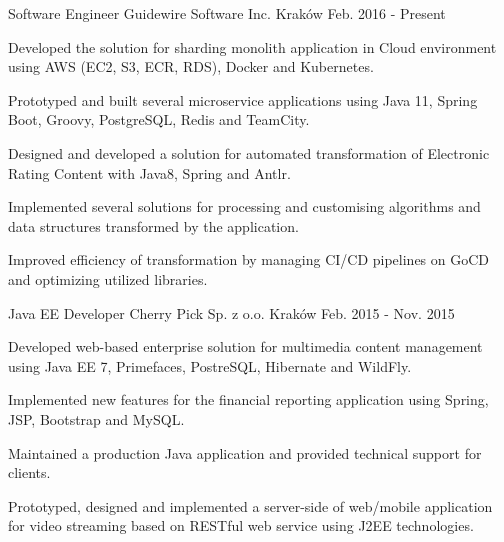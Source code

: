 

\begin{cventries}

  \cventry
    {Software Engineer} %
    {Guidewire Software Inc.} %
    {Kraków} %
    {Feb. 2016 - Present} %
    {
      \begin{cvitems} %
        \item {Developed the solution for sharding monolith application in Cloud environment using AWS (EC2, S3, ECR, RDS), Docker and Kubernetes.}
        \item {Prototyped and built several microservice applications using Java 11, Spring Boot, Groovy, PostgreSQL, Redis and TeamCity.}
        \item {Designed and developed a solution for automated transformation of Electronic Rating Content with Java8, Spring and Antlr.}
        \item {Implemented several solutions for processing and customising algorithms and data structures transformed by the application.}
        \item {Improved efficiency of transformation by managing CI/CD pipelines on GoCD and optimizing utilized libraries.}
      \end{cvitems}
    }

  \cventry
    {Java EE Developer} %
    {Cherry Pick Sp. z o.o.} %
    {Kraków} %
    {Feb. 2015 - Nov. 2015} %
    {
      \begin{cvitems} %
        \item {Developed web-based enterprise solution for multimedia content management using
Java EE 7, Primefaces, PostreSQL, Hibernate and WildFly.}
		\item {Implemented new features for the financial reporting application using Spring, JSP, Bootstrap and MySQL.}
		\item {Maintained a production Java application and provided technical support for clients.}
        \item {Prototyped, designed and implemented a server-side of web/mobile
application for video streaming based on RESTful web service using J2EE technologies.}
      \end{cvitems}
    }


\end{cventries}
